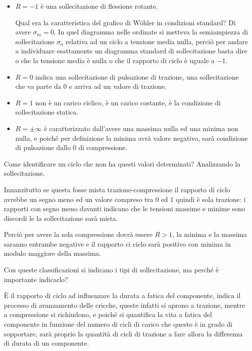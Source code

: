 		\begin{itemize}
		\item	\textbf{$ R = -1 $} è una sollecitazione di flessione rotante. 
		
		Qual era la caratteristica del grafico di Wöhler in condizioni standard? Di avere $\sigma_m  = 0$. 
		In quel diagramma nelle ordinate si metteva la semiampiezza di sollecitazione $\sigma_a$ relativa ad un ciclo a tensione media nulla, perciò per andare a individuare esattamente un diagramma standard di sollecitazione basta dire o che la tensione media è nulla o che il rapporto di ciclo è uguale a $ -1 $. 
		
		\item \textbf{$R=0$} indica una sollecitazione di pulsazione di trazione, una sollecitazione che va parte da 0 e arriva ad un valore di trazione. 
		
		\item \textbf{$R=1$} non è un carico ciclico, è un carico costante, è la condizione di sollecitazione statica.
		 
		\item \textbf{$R=\pm\infty$} è caratterizzato dall'avere una massima nulla ed una minima non nulla, e poiché per definizione la minima avrà valore negativo, sarà condizione di pulsazione dallo 0 di compressione.
		\end{itemize} 
		 
		Come identificare un ciclo che non ha questi valori determinati? Analizzando la sollecitazione.
		
		Innanzitutto se questa fosse mista trazione-compressione il rapporto di ciclo avrebbe un segno meno ed un valore compreso tra 0 ed 1 quindi è sola trazione: i rapporti con segno meno davanti indicano che le tensioni massime e minime sono discordi le la sollecitazione sarà mista. 
		
		Perciò per avere la sola compressione dovrà essere $R>1$, la minima e la massima saranno entrambe negative e il rapporto ci ciclo sarà positivo con minima in modulo maggiore della massima. \newline
		 
		Con queste classificazioni si indicano i tipi di sollecitazione, ma perché è importante indicarlo?
		
		È il rapporto di ciclo ad influenzare la durata a fatica del componente, indica il processo di avanzamento delle cricche, queste infatti si aprono a trazione, mentre a compressione si richiudono, e poiché si quantifica la vita a fatica del componente in funzione del numero di cicli di carico che questo è in grado di sopportare, sarà proprio la quantità di cicli di trazione a fare allora la differenza di durata di un componente. \newline
		 

